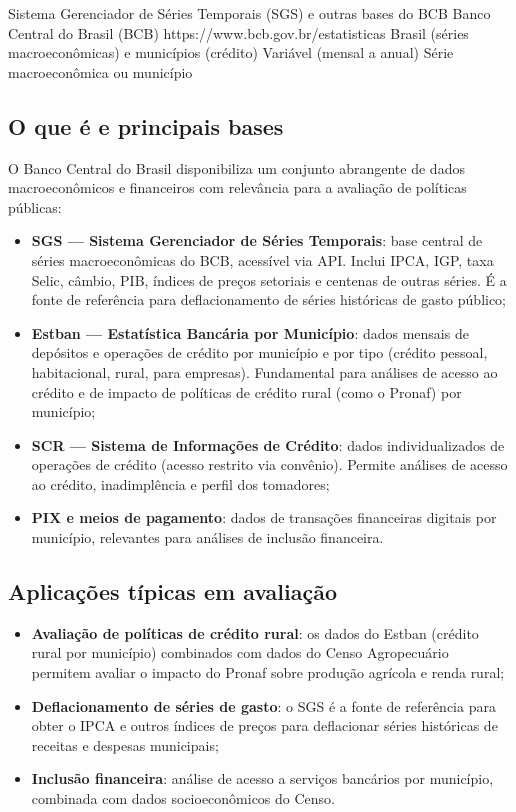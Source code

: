 \ficharapida
  {Sistema Gerenciador de Séries Temporais (SGS) e outras bases do BCB}
  {Banco Central do Brasil (BCB)}
  {https://www.bcb.gov.br/estatisticas}
  {Brasil (séries macroeconômicas) e municípios (crédito)}
  {Variável (mensal a anual)}
  {Série macroeconômica ou município}

\subsection{O que é e principais bases}

O Banco Central do Brasil disponibiliza um conjunto abrangente de dados macroeconômicos e financeiros com relevância para a avaliação de políticas públicas:

\begin{itemize}
  \item \textbf{SGS --- Sistema Gerenciador de Séries Temporais}: base central de séries macroeconômicas do BCB, acessível via API. Inclui IPCA, IGP, taxa Selic, câmbio, PIB, índices de preços setoriais e centenas de outras séries. É a fonte de referência para deflacionamento de séries históricas de gasto público;

  \item \textbf{Estban --- Estatística Bancária por Município}: dados mensais de depósitos e operações de crédito por município e por tipo (crédito pessoal, habitacional, rural, para empresas). Fundamental para análises de acesso ao crédito e de impacto de políticas de crédito rural (como o Pronaf) por município;

  \item \textbf{SCR --- Sistema de Informações de Crédito}: dados individualizados de operações de crédito (acesso restrito via convênio). Permite análises de acesso ao crédito, inadimplência e perfil dos tomadores;

  \item \textbf{PIX e meios de pagamento}: dados de transações financeiras digitais por município, relevantes para análises de inclusão financeira.
\end{itemize}

\subsection{Aplicações típicas em avaliação}

\begin{itemize}
  \item \textbf{Avaliação de políticas de crédito rural}: os dados do Estban (crédito rural por município) combinados com dados do Censo Agropecuário permitem avaliar o impacto do Pronaf sobre produção agrícola e renda rural;
  \item \textbf{Deflacionamento de séries de gasto}: o SGS é a fonte de referência para obter o IPCA e outros índices de preços para deflacionar séries históricas de receitas e despesas municipais;
  \item \textbf{Inclusão financeira}: análise de acesso a serviços bancários por município, combinada com dados socioeconômicos do Censo.
\end{itemize}

